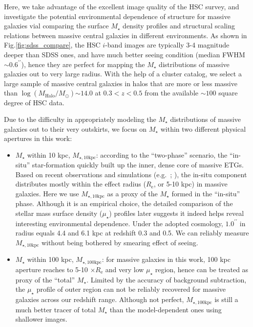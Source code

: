 \documentclass{emulateapj}
\def\arcsec{{\prime\prime}}
\def\mstar{{$M_{\star}$}}
\def\logmh{{$\log (M_{\mathrm{Halo}}/M_{\odot})$}}
\def\minn{{$M_{\star,10\mathrm{kpc}}$}}
\def\mtot{{$M_{\star,100\mathrm{kpc}}$}}
\def\mden{{$\mu_{\star}$}}
\newcommand{\update}[1]{\textcolor{Bittersweet}{#1}}
\begin{document}
\begin{CJK*}{UTF8}{gbsn}
    \update{Here, we take advantage of the excellent image quality of the HSC survey, and 
    investigate the potential environmental dependence of structure for massive galaxies 
    vial comparing the surface \mstar{} density profiles and structural scaling relations 
    between massive central galaxies in different environments. 
    As shown in Fig.\ref{fig:sdss_compare}, the HSC $i$-band images are typically 3-4 
    magnitude deeper than SDSS ones, and have much better seeing condition 
    (median FWHM$\sim 0.6^{\arcsec}$), hence they are perfect for mapping the \mstar{}
    distributions of massive galaxies out to very large radius. 
    With the help of a cluster catalog, we select a large sample of massive central 
    galaxies in halos that are more or less massive than \logmh{}$\sim 14.0$ at 
    $0.3 < z < 0.5$ from the available $\sim 100$ square degree of HSC data.}
    
    \update{Due to the difficulty in appropriately modeling the \mstar{} distributions of 
    massive galaxies out to their very outskirts, we focus on \mstar{} within two different 
    physical apertures in this work:}
    
    \begin{itemize}
        \item \update{\mstar{} within 10 kpc, \minn{}: according to the ``two-phase'' 
            scenario, the ``in-situ'' star-formation quickly built up the inner, dense 
            core of massive ETGs.  
            Based on recent observations and simulations (e.g.~\citealt{vanDokkum2010}; 
            \citealt{RodriguezGomez2016}), the in-situ 
            component distributes mostly within the effect radius ($R_{\mathrm{e}}$, 
            or 5-10 kpc) in massive galaxies.  
            Here we use \minn{} as a proxy of the \mstar{} formed in the ``in-situ''
            phase.  Although it is an empirical choice, the detailed comparison of 
            the stellar mass surface density (\mden{}) profiles later suggests it indeed 
            helps reveal interesting environmental dependence.  
            Under the adopted cosmology, $1.0^{\arcsec}$ in radius equals 4.4 and 6.1 kpc 
            at redshift 0.3 and 0.5.  
            We can reliably measure \minn{} without being bothered by smearing effect
            of seeing.}
        \item \update{\mstar{} within 100 kpc, \mtot{}: for massive galaxies in this work, 
            100 kpc aperture reaches to 5-10 $\times R_{\mathrm{e}}$ and very low 
            \mden{} region, hence can be treated as proxy of the ``total'' \mstar{}. 
            Limited by the accuracy of background subtraction, the \mden{} profile 
            of outer region can not be reliably recovered for massive galaxies across 
            our redshift range. 
            Although not perfect, \mtot{} is still a much better tracer of total 
            \mstar{} than the model-dependent ones using shallower images.}
    \end{itemize}
    

\end{CJK*}
\end{document}
